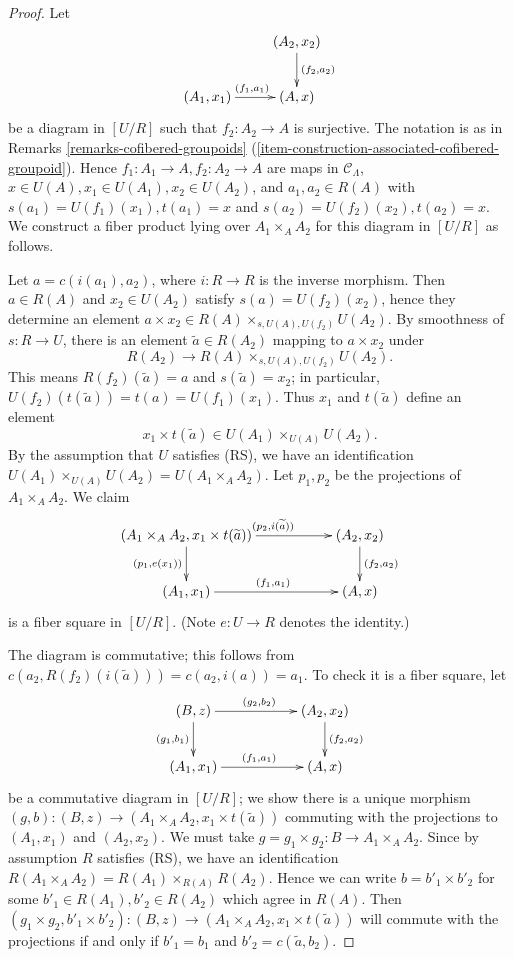 \begin{proof}
Let 
\[
\xymatrix{
                           &     (A_2,x_2) \ar[d]^{(f_2,a_2)} \\
(A_1,x_1) \ar[r]^{(f_1,a_1)} &     (A,x)
}
\]
be a diagram in $[U/R]$ such that $f_2: A_2 \to A$ is surjective. The 
notation is as in Remarks \ref{remarks-cofibered-groupoids} 
(\ref{item-construction-associated-cofibered-groupoid}).
Hence $f_1: A_1 \to A, f_2: A_2 \to A$
are maps in $\mathcal{C}_\Lambda$, $x \in U(A), x_1 
\in U(A_1), x_2 \in U(A_2)$, and $a_1,a_2 \in R(A)$ with $s(a_1) = U(f_1)(x_1), 
t(a_1) = x$ and $s(a_2) = U(f_2)(x_2), t(a_2) = x$. We construct a fiber 
product lying over $A_1 \times_{A} A_2$ for this diagram in $[U/R]$ as follows. 

\medskip \noindent 
Let $a = c(i(a_1),a_2)$, where $i: R \to R$ is the inverse morphism. 
Then $a \in R(A)$ and $x_2 \in U(A_2)$ satisfy $s(a) = U(f_2)(x_2)$, hence they 
determine an element $a \times x_2 \in R(A) \times_{s,U(A),U(f_2)} U(A_2)$. By 
smoothness of $s: R \to U$, there is an element $\widetilde{a} \in 
R(A_2)$ mapping to $a \times x_2$ under
\[ R(A_2) \to R(A) \times_{s,U(A),U(f_2)} U(A_2). \]
This means $R(f_2)(\widetilde{a}) = a$ and $s(\widetilde{a}) = x_2$; in 
particular, $U(f_2)(t(\widetilde{a})) = t(a) = U(f_1)(x_1)$. Thus $x_1$ and 
$t(\widetilde{a})$ define an element 
\[ x_1 \times t(\widetilde{a}) \in U(A_1) \times_{U(A)} U(A_2).\]
By the assumption that $U$ satisfies (RS), we have an identification $U(A_1) 
\times_{U(A)} U(A_2) = U(A_1 \times_{A} A_2)$.  Let $p_1,p_2$ be the 
projections of $A_1 \times_{A} A_2$.  We claim 
\[ 
\xymatrix{
(A_1 \times_{A} A_2, x_1 \times t(\widetilde{a})) \ar[d]_{(p_1, e(x_1))} 
\ar[rr]^{(p_2, i(\widetilde{a}))} & & (A_2, x_2) \ar[d]^{(f_2,a_2)} \\
(A_1, x_1) \ar[rr]^{(f_1,a_1)} && (A,x) 
}
\]
is a fiber square in $[U/R]$. (Note $e: U \to R$ denotes the identity.)

\medskip \noindent
The diagram is commutative; this follows from $c(a_2,R(f_2)(i(\widetilde{a}))) 
= c(a_2, i(a)) = a_1$. To check it is a fiber square, let
\[ 
\xymatrix{
(B, z) \ar[d]_{(g_1, b_1)} \ar[rr]^{(g_2, b_2)} & & (A_2, x_2) 
\ar[d]^{(f_2,a_2)} \\
(A_1, x_1) \ar[rr]^{(f_1,a_1)} && (A,x) 
}
\]
be a commutative diagram in $[U/R]$; we show there is a unique morphism $(g,b): 
(B, z) \to (A_1 \times_{A} A_2, x_1 \times t(\widetilde{a}))$ commuting 
with the projections to $(A_1,x_1)$ and $(A_2,x_2)$. We must take $g = g_1 
\times g_2: B \to A_1 \times_{A} A_2$.  Since by assumption $R$ 
satisfies (RS), we have an identification $R(A_1 \times_{A} A_2) = R(A_1) 
\times_{R(A)} R(A_2)$.  Hence we can write $b = b'_1 \times b'_2$ for some 
$b'_1 \in R(A_1), b'_2 \in R(A_2)$ which agree in $R(A)$. Then $(g_1 \times 
g_2, b'_1 \times b'_2): (B, z) \to (A_1 \times_{A} A_2, x_1 \times 
t(\widetilde{a}))$ will commute with the projections if and only if $b'_1 = 
b_1$ and $b'_2 = c(\widetilde{a}, b_2)$.
\end{proof}

